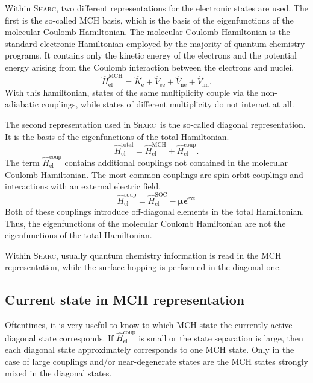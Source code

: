 \documentclass[a4paper,11pt,DIV=15,openany,twoside=false]{scrbook}
\newcommand{\sharc}{\textsc{Sharc}}
\begin{document}
Within \sharc, two different representations for the electronic states are used. The first is the so-called MCH basis, which is the basis of the eigenfunctions of the molecular Coulomb Hamiltonian. The molecular Coulomb Hamiltonian is the standard electronic Hamiltonian employed by the majority of quantum chemistry programs. It contains only the kinetic energy of the electrons and the potential energy arising from the Coulomb interaction between the electrons and nuclei.
\begin{equation}
  \hat{H}_{\text{el}}^{\text{MCH}}
  =\hat{K}_{\text{e}}
  +\hat{V}_{\text{ee}}
  +\hat{V}_{\text{ne}}
  +\hat{V}_{\text{nn}}.
\end{equation}
With this hamiltonian, states of the same multiplicity couple via the non-adiabatic couplings, while states of different multiplicity do not interact at all. 

The second representation used in \sharc\ is the so-called diagonal representation. It is the basis of the eigenfunctions of the total Hamiltonian.
\begin{equation}
  \hat{H}_{\text{el}}^{\text{total}}
  =\hat{H}_{\text{el}}^{\text{MCH}}
  +\hat{H}_{\text{el}}^{\text{coup}}.
\end{equation}
The term $\hat{H}_{\text{el}}^{\text{coup}}$ contains additional couplings not contained in the molecular Coulomb Hamiltonian. The most common couplings are spin-orbit couplings and interactions with an external electric field.
\begin{equation}
  \hat{H}_{\text{el}}^{\text{coup}}=\hat{H}_{\text{el}}^{\text{SOC}}-\boldsymbol{\mu}\boldsymbol{\epsilon}^{\text{ext}}
\end{equation}
Both of these couplings introduce off-diagonal elements in the total Hamiltonian. Thus, the eigenfunctions of the molecular Coulomb Hamiltonian are not the eigenfunctions of the total Hamiltonian. 

Within \sharc, usually quantum chemistry information is read in the MCH representation, while the surface hopping is performed in the diagonal one.

\subsection{Current state in MCH representation}\label{ssec:state_transform}

Oftentimes, it is very useful to know to which MCH state the currently active diagonal state corresponds. If $\hat{H}_{\text{el}}^{\text{coup}}$ is small or the state separation is large, then each diagonal state approximately corresponds to one MCH state. Only in the case of large couplings and/or near-degenerate states are the MCH states strongly mixed in the diagonal states.
\end{document}
